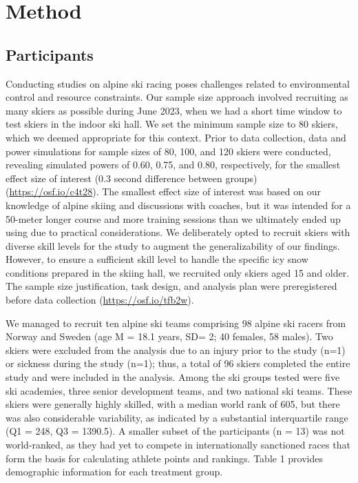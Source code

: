 \documentclass[pdflatex,sn-mathphys-num]{sn-jnl}%
\theoremstyle{thmstyleone}%
\theoremstyle{thmstyletwo}%
\theoremstyle{thmstylethree}%
\begin{document}
\section{Method}


\subsection{Participants}
Conducting studies on alpine ski racing poses challenges related to environmental control and resource constraints. Our sample size approach involved recruiting as many skiers as possible during June 2023, when we had a short time window to test skiers in the indoor ski hall. We set the minimum sample size to 80 skiers, which we deemed appropriate for this context. Prior to data collection, data and power simulations for sample sizes of 80, 100, and 120 skiers were conducted, revealing simulated powers of 0.60, 0.75, and 0.80, respectively, for the smallest effect size of interest (0.3 second difference between groups) (\url{https://osf.io/c4t28}). The smallest effect size of interest was based on our knowledge of alpine skiing and discussions with coaches, but it was intended for a 50-meter longer course and more training sessions than we ultimately ended up using due to practical considerations. We deliberately opted to recruit skiers with diverse skill levels for the study to augment the generalizability of our findings. However, to ensure a sufficient skill level to handle the specific icy snow conditions prepared in the skiing hall, we recruited only skiers aged 15 and older. The sample size justification, task design, and analysis plan were preregistered before data collection (\url{https://osf.io/tfb2w}).

We managed to recruit ten alpine ski teams comprising 98 alpine ski racers from Norway and Sweden (age M = 18.1 years, SD= 2; 40 females, 58 males). Two skiers were excluded from the analysis due to an injury prior to the study (n=1) or sickness during the study (n=1); thus, a total of 96 skiers completed the entire study and were included in the analysis.  Among the ski groups tested were five ski academies, three senior development teams, and two national ski teams. These skiers were generally highly skilled, with a median world rank of 605, but there was also considerable variability, as indicated by a substantial interquartile range (Q1 = 248, Q3 = 1390.5). A smaller subset of the participants (n = 13) was not world-ranked, as they had yet to compete in internationally sanctioned races that form the basis for calculating athlete points and rankings. Table 1 provides demographic information for each treatment group.
\end{document}
